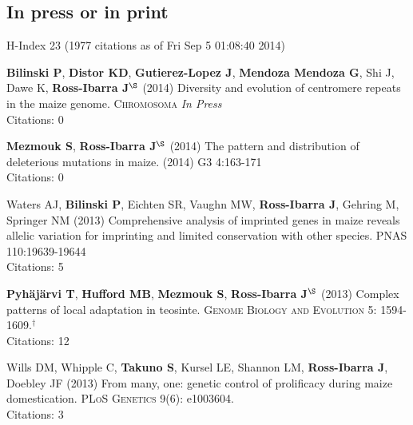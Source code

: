 \documentclass[letterpaper]{article}
\begin{document}
\subsection*{In press or in print} %
 \small{H-Index 23 (1977 citations as of Fri Sep  5 01:08:40 2014)}

\begin{etaremune}

\item {\bf Bilinski P}, {\bf Distor KD}, {\bf Gutierez-Lopez J}, {\bf Mendoza Mendoza G}, Shi J, Dawe K,  {\bf Ross-Ibarra J}$^\S$ (2014) Diversity and evolution of centromere repeats in the maize genome. \textsc{Chromosoma} \emph{In Press}
\\Citations: 0\\

\item {\bf Mezmouk S}, {\bf Ross-Ibarra J}$^\S$ (2014) The pattern and distribution of deleterious mutations in maize. (2014) \textsc{G3} 4:163-171
\\Citations: 0\\

\item Waters AJ, {\bf Bilinski P}, Eichten SR, Vaughn MW, {\bf Ross-Ibarra J}, Gehring M, Springer NM (2013) Comprehensive analysis of imprinted genes in maize reveals allelic variation for imprinting and limited conservation with other species. \textsc{PNAS} 110:19639-19644 
\\Citations: 5\\

\item {\bf Pyh\"aj\"arvi T}, {\bf Hufford MB}, {\bf Mezmouk S}, {\bf Ross-Ibarra J}$^\S$ (2013) Complex patterns of local adaptation in teosinte. \textsc{Genome Biology and Evolution} 5: 1594-1609.$^\dagger$
\\Citations: 12\\

\item Wills DM, Whipple C, {\bf Takuno S}, Kursel LE, Shannon LM, {\bf Ross-Ibarra J}, Doebley JF (2013) From many, one: genetic control of prolificacy during maize domestication. \textsc{PLoS Genetics} 9(6): e1003604. %
\\Citations: 3\\


\end{etaremune}
\end{document}
